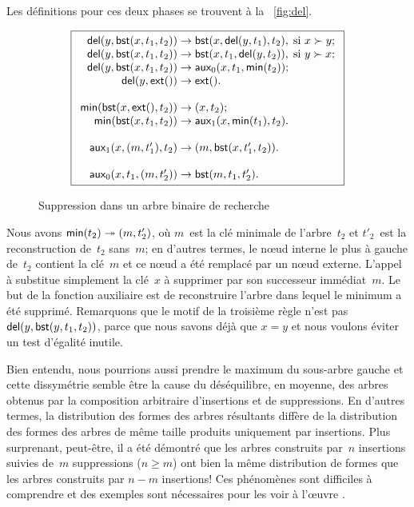 Les définitions pour ces deux phases se trouvent à la
\fig~\vref{fig:del}.
\begin{figure}
\begin{equation*}
\boxed{
\begin{array}{r@{\;}l@{\;}l}
  \fun{del}(y,\fun{bst}(x,t_1,t_2)) & \rightarrow &
  \fun{bst}(x,\fun{del}(y,t_1),t_2),\; \text{si \(x \succ y\)};\\
\fun{del}(y,\fun{bst}(x,t_1,t_2)) & \rightarrow &
  \fun{bst}(x,t_1,\fun{del}(y,t_2)),\; \text{si \(y \succ x\)};\\
\fun{del}(y,\fun{bst}(x,t_1,t_2)) & \rightarrow &
   \fun{aux}_0(x,t_1,\fun{min}(t_2));\\
\fun{del}(y,\fun{ext}()) & \rightarrow & \fun{ext}().\\
\\
\fun{min}(\fun{bst}(x,\fun{ext}(),t_2)) & \rightarrow & \pair{x}{t_2};\\
\fun{min}(\fun{bst}(x,t_1,t_2)) & \rightarrow &
  \fun{aux}_1(x,\fun{min}(t_1),t_2).\\
\\
\fun{aux}_1(x,\pair{m}{t'_1},t_2) & \rightarrow &
  \pair{m}{\fun{bst}(x,t'_1,t_2)}.\\
\\
\fun{aux}_0(x,t_1,\pair{m}{t'_2}) & \rightarrow & \fun{bst}(m,t_1,t'_2).
\end{array}}
\end{equation*}
\caption{Suppression dans un arbre binaire de recherche}
\label{fig:del}
\end{figure}
Nous avons \(\textsf{min}(t_2) \twoheadrightarrow
({m},{t'_2})\), où \(m\)~est la clé minimale
de l'arbre~\(t_2\) et \(t'_2\)~est la reconstruction de~\(t_2\)
sans~\(m\); en d'autres termes, le nœud interne le plus à gauche
de~\(t_2\) contient la clé~\(m\) et ce nœud a été remplacé par un nœud
externe. L'appel à  substitue simplement la clé~\(x\)
à supprimer par son successeur immédiat~\(m\). Le but de la fonction
auxiliaire  est de reconstruire l'arbre dans lequel
le minimum a été supprimé. Remarquons que le motif de la troisième
règle n'est pas \(\textsf{del}(y,
\textsf{bst}(y,t_1,t_2))\), parce que nous savons
déjà que \(x=y\) et nous voulons éviter un test d'égalité
inutile.

Bien entendu, nous pourrions aussi prendre le maximum du sous-arbre
gauche et cette dissymétrie semble être la cause du déséquilibre, en
moyenne, des arbres obtenus par la composition arbitraire d'insertions
et de suppressions. En d'autres termes, la distribution des formes des
arbres résultants diffère de la distribution des formes des arbres de
même taille produits uniquement par insertions. Plus surprenant,
peut-être, il a été démontré que les arbres construits par~\(n\)
insertions suivies de~\(m\) suppressions (\(n \geq m\)) ont bien la
même distribution de formes que les arbres construits par \(n-m\)
insertions! Ces phénomènes sont difficiles à comprendre et des
exemples sont nécessaires pour les voir à l'œuvre
\citep{Panny_2010,Eppinger_1983,CulbersonMunro_1989,CulbersonEvans_1994,Knuth_1998a,Heyer_2009}.

